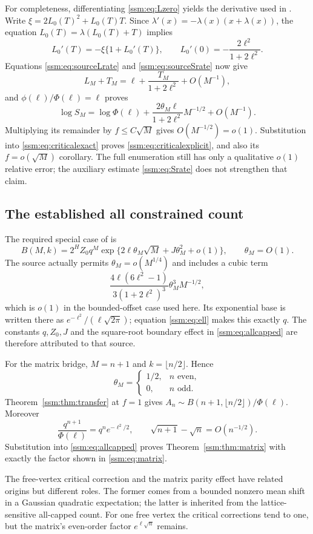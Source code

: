For completeness, differentiating \eqref{ssm:eq:Lzero} yields the derivative used in \cite[equation (14)]{mww}. Write $\xi=2L_0(T)^2+L_0(T)T$. Since $\lambda'(x)=-\lambda(x)(x+\lambda(x))$, the equation $L_0(T)=\lambda(L_0(T)+T)$ implies
\[
 L_0'(T)=-\xi\{1+L_0'(T)\},\qquad
 L_0'(0)=-\frac{2\ell^2}{1+2\ell^2}.
\]
Equations \eqref{ssm:eq:sourceLrate} and \eqref{ssm:eq:sourceSrate} now give
\[
 L_M+T_M=\ell+\frac{T_M}{1+2\ell^2}+O(M^{-1}),
\]
and $\phi(\ell)/\Phi(\ell)=\ell$ proves
\begin{equation}\label{ssm:eq:Srate}
 \log S_M=\log\Phi(\ell)+\frac{2\theta_M\ell}{1+2\ell^2}M^{-1/2}
 +O(M^{-1}).
\end{equation}
Multiplying its remainder by $f\le C\sqrt M$ gives $O(M^{-1/2})=o(1)$. Substitution into \eqref{ssm:eq:criticalexact} proves \eqref{ssm:eq:criticalexplicit}, and also its $f=o(\sqrt M)$ corollary. The full enumeration still has only a qualitative $o(1)$ relative error; the auxiliary estimate \eqref{ssm:eq:Srate} does not strengthen that claim.

\subsection{The established all constrained count}
The required special case of \cite[Corollary 2]{mww} is
\begin{equation}\label{ssm:eq:allcapped}
 B(M,k)=2^H Z_0q^M
 \exp\{2\ell\theta_M\sqrt M+J\theta_M^2+o(1)\},
 \qquad \theta_M=O(1).
\end{equation}
The source actually permits $\theta_M=o(M^{1/4})$ and includes a cubic term
\[
 \frac{4\ell(6\ell^2-1)}{3(1+2\ell^2)^3}\theta_M^3M^{-1/2},
\]
which is $o(1)$ in the bounded-offset case used here. Its exponential base is written there as $e^{-\ell^2}/(\ell\sqrt{2\pi})$; equation \eqref{ssm:eq:ell} makes this exactly $q$. The constants $q,Z_0,J$ and the square-root boundary effect in \eqref{ssm:eq:allcapped} are therefore attributed to that source.

For the matrix bridge, $M=n+1$ and $k=\lfloor n/2\rfloor$. Hence
\[
 \theta_M=\begin{cases}1/2,&n\text{ even},\\0,&n\text{ odd}.
 \end{cases}
\]
Theorem~\ref{ssm:thm:transfer} at $f=1$ gives
$A_n\sim B(n+1,\lfloor n/2\rfloor)/\Phi(\ell)$. Moreover
\[
 \frac{q^{n+1}}{\Phi(\ell)}=q^ne^{-\ell^2/2},\qquad
 \sqrt{n+1}-\sqrt n=O(n^{-1/2}).
\]
Substitution into \eqref{ssm:eq:allcapped} proves Theorem~\ref{ssm:thm:matrix} with exactly the factor shown in \eqref{ssm:eq:matrix}.

The free-vertex critical correction and the matrix parity effect have related origins but different roles. The former comes from a bounded nonzero mean shift in a Gaussian quadratic expectation; the latter is inherited from the lattice-sensitive all-capped count. For one free vertex the critical corrections tend to one, but the matrix's even-order factor $e^{\ell\sqrt n}$ remains.
